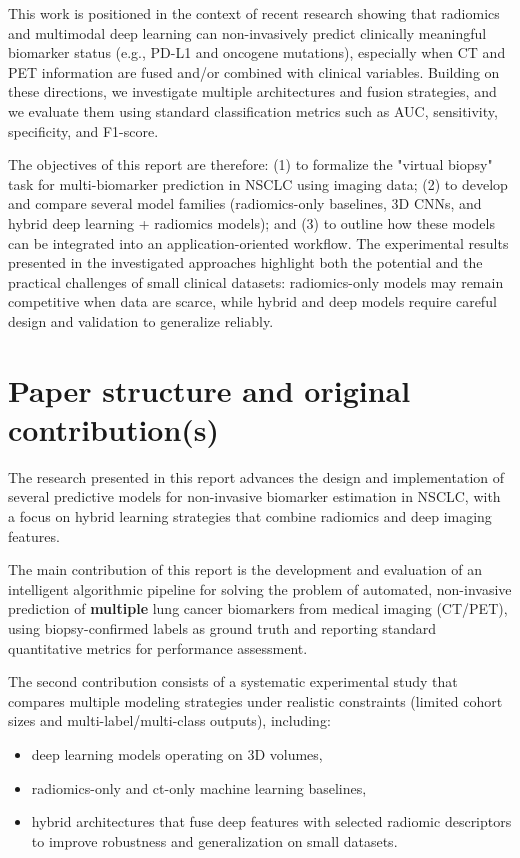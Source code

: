 \documentclass[twoside,runningheads,a4paper,11pt]{report}
\begin{document}
This work is positioned in the context of recent research showing that radiomics and multimodal deep learning can non-invasively predict clinically meaningful biomarker status (e.g., PD-L1 and oncogene mutations), especially when CT and PET information are fused and/or combined with clinical variables. Building on these directions, we investigate multiple architectures and fusion strategies, and we evaluate them using standard classification metrics such as AUC, sensitivity, specificity, and F1-score.

The objectives of this report are therefore: (1) to formalize the "virtual biopsy" task for multi-biomarker prediction in NSCLC using imaging data; (2) to develop and compare several model families (radiomics-only baselines, 3D CNNs, and hybrid deep learning + radiomics models); and (3) to outline how these models can be integrated into an application-oriented workflow. The experimental results presented in the investigated approaches highlight both the potential and the practical challenges of small clinical datasets: radiomics-only models may remain competitive when data are scarce, while hybrid and deep models require careful design and validation to generalize reliably. 


\section{Paper structure and original contribution(s)}
\label{section:structure}

The research presented in this report advances the design and implementation of several predictive models for non-invasive biomarker estimation in NSCLC, with a focus on hybrid learning strategies that combine radiomics and deep imaging features.

The main contribution of this report is the development and evaluation of an intelligent algorithmic pipeline for solving the problem of automated, non-invasive prediction of \textbf{multiple} lung cancer biomarkers from medical imaging (CT/PET), using biopsy-confirmed labels as ground truth and reporting standard quantitative metrics for performance assessment.

The second contribution consists of a systematic experimental study that compares multiple modeling strategies under realistic constraints (limited cohort sizes and multi-label/multi-class outputs), including:
\begin{itemize}
    \item deep learning models operating on 3D volumes,
    \item radiomics-only and ct-only machine learning baselines,
    \item hybrid architectures that fuse deep features with selected radiomic descriptors to improve robustness and generalization on small datasets.
\end{itemize}
\end{document}
